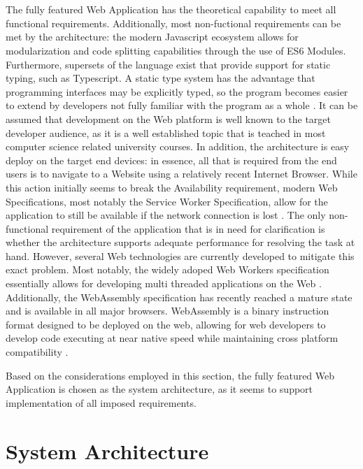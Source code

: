 \\\\
The fully featured Web Application has the theoretical capability to meet all functional requirements. Additionally, most non-fuctional requirements can be met by the architecture: the modern Javascript ecosystem allows for modularization and code splitting capabilities through the use of ES6 Modules. Furthermore, supersets of the language exist that provide support for static typing, such as Typescript. A static type system has the advantage that programming interfaces may be explicitly typed, so the program becomes easier to extend by developers not fully familiar with the program as a whole \cite{TypescriptUnderstanding}. It can be assumed that development on the Web platform is well known to the target developer audience, as it is a well established topic that is teached in most computer science related university courses. In addition, the architecture is easy deploy on the target end devices: in essence, all that is required from the end users is to navigate to a Website using a relatively recent Internet Browser. While this action initially seems to break the Availability requirement, modern Web Specifications, most notably the Service Worker Specification, allow for the application to still be available if the network connection is lost \cite{serviceworkersdraft}. The only non-functional requirement of the application that is in need for clarification is whether the architecture supports adequate performance for resolving the task at hand. However, several Web technologies are currently developed to mitigate this exact problem. Most notably, the widely adoped Web Workers specification essentially allows for developing multi threaded applications on the Web \cite{workerdraft}. Additionally, the WebAssembly specification has recently reached a mature state and is available in all major browsers. WebAssembly is a binary instruction format designed to be deployed on the web, allowing for web developers to develop code executing at near native speed while maintaining cross platform compatibility \cite{wasmdraft}.

Based on the considerations employed in this section, the fully featured Web Application is chosen as the system architecture, as it seems to support implementation of all imposed requirements.

\section{System Architecture}

